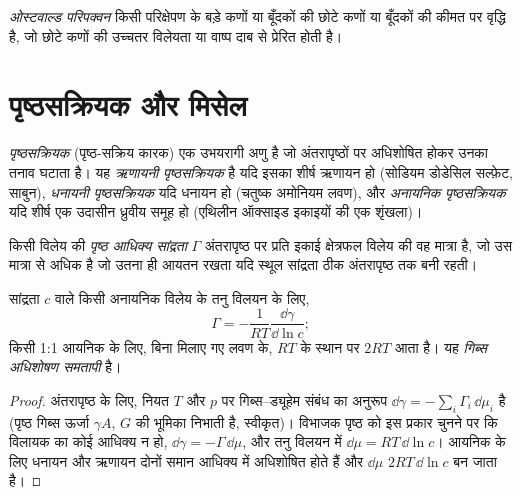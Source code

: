 \begin{definition}[ओस्टवाल्ड परिपक्वन]\label{def:b3:colloids:ripening}
\emph{ओस्टवाल्ड परिपक्वन} किसी परिक्षेपण के बड़े
कणों या बूँदकों की छोटे कणों या बूँदकों की कीमत पर वृद्धि है,
जो छोटे कणों की उच्चतर विलेयता या वाष्प दाब से प्रेरित होती है।
\end{definition}

\section{पृष्ठसक्रियक और मिसेल}

\begin{definition}[पृष्ठसक्रियक]\label{def:b3:colloids:surfactant}
\emph{पृष्ठसक्रियक} (पृष्ठ-सक्रिय कारक) एक उभयरागी
अणु है जो अंतरापृष्ठों पर अधिशोषित होकर उनका तनाव घटाता है। यह
\emph{ऋणायनी पृष्ठसक्रियक} है यदि इसका शीर्ष ऋणायन हो (सोडियम
डोडेसिल सल्फ़ेट, साबुन), \emph{धनायनी पृष्ठसक्रियक}
यदि धनायन हो (चतुष्क अमोनियम लवण), और \emph{अनायनिक
पृष्ठसक्रियक} यदि शीर्ष एक उदासीन ध्रुवीय समूह हो (एथिलीन
ऑक्साइड इकाइयों की एक शृंखला)।
\end{definition}

\begin{definition}[पृष्ठ आधिक्य सांद्रता]\label{def:b3:colloids:surface-excess}
किसी विलेय की \emph{पृष्ठ आधिक्य सांद्रता} $\Gamma$
अंतरापृष्ठ पर प्रति इकाई क्षेत्रफल विलेय की वह मात्रा है, जो उस मात्रा से अधिक है
जो उतना ही आयतन रखता यदि स्थूल सांद्रता ठीक अंतरापृष्ठ तक
बनी रहती।
\end{definition}

\begin{theorem}[गिब्स अधिशोषण समतापी]\label{thm:b3:colloids:gibbs-adsorption}
सांद्रता $c$ वाले किसी अनायनिक विलेय के तनु विलयन के लिए,
\[
  \Gamma = -\frac{1}{RT}\frac{\dd\gamma}{\dd\ln c};
\]
किसी 1:1 आयनिक  के लिए, बिना मिलाए गए लवण के, $RT$ के स्थान पर $2RT$ आता है। यह
\emph{गिब्स अधिशोषण समतापी} है।
\end{theorem}

\begin{proof}
अंतरापृष्ठ के लिए, नियत $T$ और
$p$ पर गिब्स--ड्यूहेम संबंध का अनुरूप $\dd\gamma = -\sum_i\Gamma_i\,\dd\mu_i$ है (पृष्ठ गिब्स ऊर्जा $\gamma A$, $G$ की भूमिका निभाती है,
स्वीकृत)। विभाजक पृष्ठ को इस प्रकार चुनने पर कि विलायक का कोई आधिक्य न हो,
$\dd\gamma = -\Gamma\,\dd\mu$, और तनु विलयन में $\dd\mu = RT\,\dd\ln c$। आयनिक  के लिए
धनायन और ऋणायन दोनों समान आधिक्य में अधिशोषित होते हैं और $\dd\mu$
$2RT\,\dd\ln c$ बन जाता है।
\end{proof}


